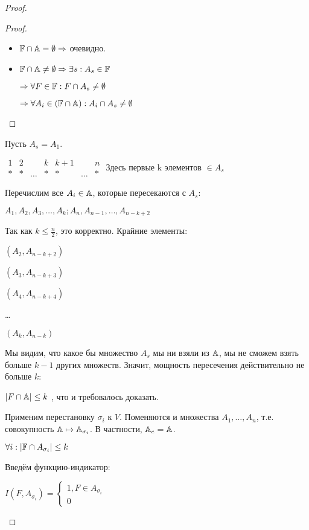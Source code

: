 \begin{proof}
\begin{enumerate}
\begin{proof}
\begin{itemize}
\item 
$\mathbb{F} \cap \mathbb{A} = \emptyset \Rightarrow$ очевидно.

\item

$\mathbb{F} \cap \mathbb{A} \neq \emptyset \Rightarrow \exists s: A_s \in \mathbb{F}  $

$\Rightarrow \forall F \in \mathbb{F} : F \cap A_s \neq \emptyset$

$\Rightarrow \forall A_i \in (\mathbb{F} \cap \mathbb{A}) : A_i \cap A_s \neq \emptyset$

\end{itemize}
\end{proof}
 
Пусть $A_s = A_1$.

$
\begin{matrix}
1 & 2 & ~ & k & k+1 & ~ & n \\ 
 * & * & \dots & * & * & \dots & * 
\end{matrix}
$ \quad Здесь первые k элементов $\in A_s$

Перечислим все $A_i \in \mathbb{A}$, которые пересекаются с $A_s$:

$A_1, A_2, A_3, \dots, A_k; A_n, A_{n-1},\dots, A_{n-k+2}$

Так как $k \leq \frac n 2$, это корректно. Крайние элементы:

$(A_2, A_{n-k+2})$

$(A_3, A_{n-k+3})$

$(A_4, A_{n-k+4})$

\dots

$(A_k, A_{n-k})$

Мы видим, что какое  бы   множество $A_s$ мы ни взяли из $\mathbb{A}$, мы не сможем взять больше $k-1$ других множеств. Значит, мощность пересечения действительно не больше $k$:

$|F \cap \mathbb{A} | \leq k$  , что и требовалось доказать.

Применим перестановку $\sigma_i $ к $V$. Поменяются и множества $A_1, \dots, A_n$, т.е. совокупность $\mathbb{A} \mapsto \mathbb{A} _{\sigma_i}$. В частности, $\mathbb{A}_e = \mathbb{A}$. 

\begin{alem}[2]
$\forall i: |\mathbb{F} \cap A_{\sigma_i}| \leq k$
\end{alem}
 
Введём функцию-индикатор:

$I(F, A_{\sigma_i} )=
\begin{cases}
1, F \in A_{\sigma_i}\\
0
\end{cases}
$


\end{enumerate}
\end{proof}

